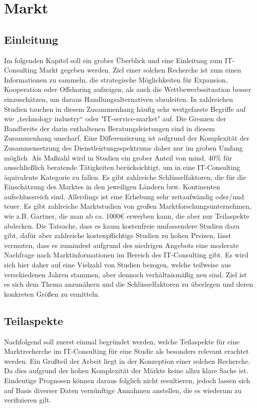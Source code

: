 \section{Markt}
\subsection{Einleitung}
Im folgenden Kapitel soll ein grober Überblick und eine Einleitung zum IT-Consulting Markt gegeben werden. 
Ziel einer solchen Recherche ist zum einen Informationen zu sammeln, die strategische Möglichkeiten für Expansion, Kooperation oder Offshoring aufzeigen, 
als auch die Wettbewerbssituation besser einzuschätzen, um daraus Handlungsalternativen abzuleiten. 
In zahlreichen Studien tauchen in diesem Zusammenhang häufig sehr weitgefasste Begriffe auf wie „technology industry“ oder "IT-service-market" auf. 
Die Grenzen der Bandbreite der darin enthaltenen Beratungsleistungen sind in diesem Zusammenhang unscharf. Eine Differenzierung ist aufgrund der Komplexität der Zusammensetzung des Dienstleistungsspektrums daher nur im groben Umfang möglich.
Als Maßzahl wird in Studien ein grober Anteil von mind. 40\% für ausschließlich beratende Tätigkeiten berücksichtigt, um in eine IT-Consulting äquivalente Kategorie zu fallen.
Es gibt zahlreiche Schlüsselfaktoren, die für die Einschätzung des Marktes in den jeweiligen Ländern bzw. Kontinenten aufschlussreich sind. 
Allerdings ist eine Erhebung sehr zeitaufwändig oder/und teuer. Es gibt zahlreiche Marktstudien von großen Marktforschungsunternehmen, wie z.B. Gartner, die man ab ca. 1000€  erwerben kann, die aber nur Teilaspekte abdecken. 
Die Tatsache, dass es kaum kostenfreie umfassendere Studien dazu gibt, dafür aber zahlreiche kostenpflichtige Studien zu hohen Preisen, lässt vermuten, dass es zumindest aufgrund des niedrigen Angebots eine moderate Nachfrage nach Marktinformationen im Bereich des IT-Consulting gibt.
 Es wird sich hier daher auf eine Vielzahl von Studien bezogen, welche teilweise aus verschiedenen Jahren stammen, aber dennoch verhältnismäßig neu sind.
 Ziel ist es sich dem Thema anzunähern und die Schlüsselfaktoren zu überlegen und deren konkreten Größen zu ermitteln.

\subsection{Teilaspekte}
Nachfolgend soll zuerst einmal begründet werden, welche Teilaspekte für eine Marktrecherche im IT-Consulting für eine Studie als besonders relevant erachtet werden.
Ein Großteil der Arbeit liegt in der Konzeption einer solchen Recherche. Da dies aufgrund der hohen Komplexität der Märkte keine allzu klare Sache ist. Eindeutige Prognosen können daraus folglich nicht resultieren, jedoch lassen sich auf Basis diverser Daten vernünftige Annahmen anstellen, die es wiederum zu verifizieren gilt. 
